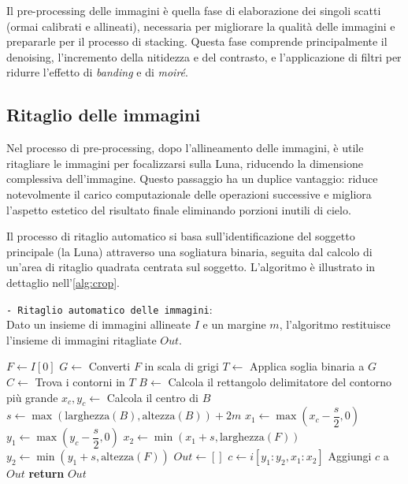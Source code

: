Il pre-processing delle immagini è quella fase di elaborazione dei singoli scatti (ormai calibrati e allineati), necessaria per migliorare la qualità delle immagini e prepararle per il processo di stacking. Questa fase comprende principalmente il denoising, l'incremento della nitidezza e del contrasto, e l'applicazione di filtri per ridurre l'effetto di \textit{banding} e di \textit{moiré}.

\subsection{Ritaglio delle immagini} \label{subsec:crop}

Nel processo di pre-processing, dopo l'allineamento delle immagini, è utile ritagliare le immagini per focalizzarsi sulla Luna, riducendo la dimensione complessiva dell'immagine. Questo passaggio ha un duplice vantaggio: riduce notevolmente il carico computazionale delle operazioni successive e migliora l'aspetto estetico del risultato finale eliminando porzioni inutili di cielo.

Il processo di ritaglio automatico si basa sull'identificazione del soggetto principale (la Luna) attraverso una sogliatura binaria, seguita dal calcolo di un'area di ritaglio quadrata centrata sul soggetto. L'algoritmo è illustrato in dettaglio nell'\cref{alg:crop}.

\begin{algorithm}[H]
    \caption{\texttt{- Ritaglio automatico delle immagini}:\\ Dato un insieme di immagini allineate $I$ e un margine $m$, l'algoritmo restituisce l'insieme di immagini ritagliate $Out$.} \label{alg:crop}
    \begin{algorithmic}[1]
            \State $F \gets I[0]$ 
            \State $G \gets$ Converti $F$ in scala di grigi
            \State $T \gets$ Applica soglia binaria a $G$ 
            \State $C \gets$ Trova i contorni in $T$
            \State $B \gets$ Calcola il rettangolo delimitatore del contorno più grande
            \State $x_c, y_c \gets$ Calcola il centro di $B$
            \State $s \gets \max(\text{larghezza}(B), \text{altezza}(B)) + 2m$ 
            \State $x_1 \gets \max\left(x_c - \dfrac{s}{2}, 0\right)$ 
            \State $y_1 \gets \max\left(y_c - \dfrac{s}{2}, 0\right)$
            \State $x_2 \gets \min\left(x_1 + s, \text{larghezza}(F)\right)$
            \State $y_2 \gets \min\left(y_1 + s, \text{altezza}(F)\right)$
            \State $Out \gets []$
                \State $c \gets i[y_1:y_2, x_1:x_2]$ 
                \State Aggiungi $c$ a $Out$
            \EndFor
            \State \textbf{return} $Out$
        \EndFunction
    \end{algorithmic}
\end{algorithm}

